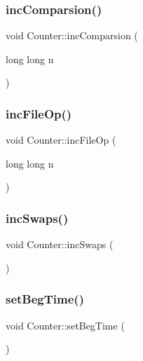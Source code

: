 \subsubsection{\texorpdfstring{inc\+Comparsion()}{incComparsion()}}
{\footnotesize\ttfamily void Counter\+::inc\+Comparsion (\begin{DoxyParamCaption}\item[{long long}]{n }\end{DoxyParamCaption})}

\hypertarget{class_counter_a63310182709c321ad8fe8e78b81d12aa}{}\label{class_counter_a63310182709c321ad8fe8e78b81d12aa} 
\subsubsection{\texorpdfstring{inc\+File\+Op()}{incFileOp()}}
{\footnotesize\ttfamily void Counter\+::inc\+File\+Op (\begin{DoxyParamCaption}\item[{long long}]{n }\end{DoxyParamCaption})}

\hypertarget{class_counter_aa0cd30379394257e44aa7afc84ed1fce}{}\label{class_counter_aa0cd30379394257e44aa7afc84ed1fce} 
\subsubsection{\texorpdfstring{inc\+Swaps()}{incSwaps()}}
{\footnotesize\ttfamily void Counter\+::inc\+Swaps (\begin{DoxyParamCaption}{ }\end{DoxyParamCaption})}

\hypertarget{class_counter_a71dea1262b81493aa9734f62a72b2691}{}\label{class_counter_a71dea1262b81493aa9734f62a72b2691} 
\subsubsection{\texorpdfstring{set\+Beg\+Time()}{setBegTime()}}
{\footnotesize\ttfamily void Counter\+::set\+Beg\+Time (\begin{DoxyParamCaption}{ }\end{DoxyParamCaption})}

